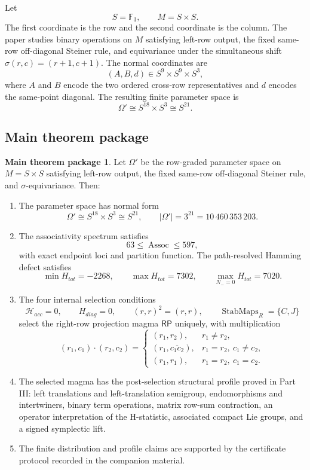 \documentclass[11pt]{article}
\theoremstyle{definition}
\newtheorem*{mainthm}{Main theorem package}
\newcommand{\RP}{\mathsf{RP}}
\begin{document}
Let
\[
S=\mathbb F_3,
\qquad
M=S\times S.
\]
The first coordinate is the row and the second coordinate is the column.  The
paper studies binary operations on \(M\) satisfying left-row output, the fixed
same-row off-diagonal Steiner rule, and equivariance under the simultaneous
shift \(\sigma(r,c)=(r+1,c+1)\).  The normal coordinates are
\[
(A,B,d)\in S^9\times S^9\times S^3,
\]
where \(A\) and \(B\) encode the two ordered cross-row representatives and
\(d\) encodes the same-point diagonal.  The resulting finite parameter space is
\[
\Omega'\cong S^{18}\times S^3\cong S^{21}.
\]

\subsection*{Main theorem package}\label{intro-main-theorem-package}

\begin{mainthm}
Let \(\Omega'\) be the row-graded parameter space on \(M=S\times S\) satisfying
left-row output, the fixed same-row off-diagonal Steiner rule, and
\(\sigma\)-equivariance.  Then:
\begin{enumerate}[leftmargin=2em]
\item The parameter space has normal form
\[
\Omega'\cong S^{18}\times S^3\cong S^{21},
\qquad
|\Omega'|=3^{21}=10\,460\,353\,203.
\]
\item The associativity spectrum satisfies
\[
63\le\operatorname{Assoc}\le597,
\]
with exact endpoint loci and partition function.  The path-resolved Hamming
defect satisfies
\[
\min H_{tot}=-2268,
\qquad
\max H_{tot}=7302,
\qquad
\max_{N_-=0}H_{tot}=7020.
\]
\item The four internal selection conditions
\[
\mathcal H_{acc}=0,
\qquad
H_{diag}=0,
\qquad
(r,r)^2=(r,r),
\qquad
\operatorname{StabMaps}_{R}=\{C,J\}
\]
select the right-row projection magma \(\RP\) uniquely, with multiplication
\[
(r_1,c_1)\cdot(r_2,c_2)=
\begin{cases}
(r_1,r_2), & r_1\ne r_2,\\[2mm]
(r_1,\overline{c_1c_2}), & r_1=r_2,\ c_1\ne c_2,\\[2mm]
(r_1,r_1), & r_1=r_2,\ c_1=c_2.
\end{cases}
\]
\item The selected magma has the post-selection structural profile proved in Part III:
left translations and left-translation semigroup, endomorphisms and
intertwiners, binary term operations, matrix row-sum contraction, an
operator interpretation of the H-statistic, associated compact Lie groups, and a
signed symplectic lift.
\item The finite distribution and profile claims are supported by the certificate
protocol recorded in the companion material.
\end{enumerate}
\end{mainthm}
\end{document}
